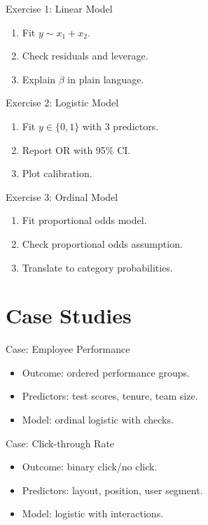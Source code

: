 \documentclass[aspectratio=169]{beamer}
\begin{document}
\begin{frame}{Exercise 1: Linear Model}
\begin{enumerate}
  \item Fit $y \sim x_1 + x_2$.
  \item Check residuals and leverage.
  \item Explain $\beta$ in plain language.
\end{enumerate}
\end{frame}

\begin{frame}{Exercise 2: Logistic Model}
\begin{enumerate}
  \item Fit $y\in\{0,1\}$ with 3 predictors.
  \item Report OR with 95\% CI.
  \item Plot calibration.
\end{enumerate}
\end{frame}

\begin{frame}{Exercise 3: Ordinal Model}
\begin{enumerate}
  \item Fit proportional odds model.
  \item Check proportional odds assumption.
  \item Translate to category probabilities.
\end{enumerate}
\end{frame}

\section{Case Studies}

\begin{frame}{Case: Employee Performance}
\begin{itemize}
  \item Outcome: ordered performance groups.
  \item Predictors: test scores, tenure, team size.
  \item Model: ordinal logistic with checks.
\end{itemize}
\end{frame}

\begin{frame}{Case: Click-through Rate}
\begin{itemize}
  \item Outcome: binary click/no click.
  \item Predictors: layout, position, user segment.
  \item Model: logistic with interactions.
\end{itemize}
\end{frame}
\end{document}
